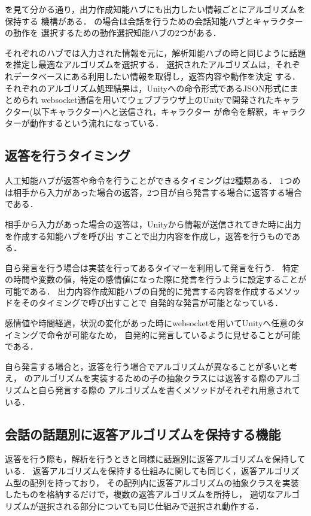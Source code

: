 
を見て分かる通り，出力作成知能ハブにも出力したい情報ごとにアルゴリズムを保持する
機構がある．
の場合は会話を行うための会話知能ハブとキャラクターの動作を
選択するための動作選択知能ハブの2つがある．

それぞれのハブでは入力された情報を元に，解析知能ハブの時と同じように話題を推定し最適なアルゴリズムを選択する．
選択されたアルゴリズムは，それぞれデータベースにある利用したい情報を取得し，返答内容や動作を決定
する．
それぞれのアルゴリズム処理結果は，Unityへの命令形式であるJSON形式にまとめられ
websocket通信を用いてウェブブラウザ上のUnityで開発されたキャラクター(以下キャラクター)へと送信され，キャラクター
が命令を解釈，キャラクターが動作するという流れになっている．

\subsection{返答を行うタイミング}
人工知能ハブが返答や命令を行うことができるタイミングは2種類ある．
1つめは相手から入力があった場合の返答，2つ目が自ら発言する場合に返答する場合である．

相手から入力があった場合の返答は，Unityから情報が送信されてきた時に出力を作成する知能ハブを呼び出
すことで出力内容を作成し，返答を行うものである．

自ら発言を行う場合は実装を行ってあるタイマーを利用して発言を行う．
特定の時間や変数の値，特定の感情値になった際に発言を行うように設定することが可能である．
出力内容作成知能ハブの自発的に発言する内容を作成するメソッドをそのタイミングで呼び出すことで
自発的な発言が可能となっている．

感情値や時間経過，状況の変化があった時にwebsocketを用いてUnityへ任意のタイミングで命令が可能なため，
自発的に発言しているように見せることが可能である．

自ら発言する場合と，返答を行う場合でアルゴリズムが異なることが多いと考え，
のアルゴリズムを実装するための子の抽象クラスには返答する際のアルゴリズムと自ら発言する際の
アルゴリズムを書くメソッドがそれぞれ用意されている．

\subsection{会話の話題別に返答アルゴリズムを保持する機能}
返答を行う際も，解析を行うときと同様に話題別に返答アルゴリズムを保持している．
返答アルゴリズムを保持する仕組みに関しても同じく，返答アルゴリズム型の配列を持っており，
その配列内に返答アルゴリズムの抽象クラスを実装したものを格納するだけで，複数の返答アルゴリズムを所持し，
適切なアルゴリズムが選択される部分についても同じ仕組みで選択され動作する．

